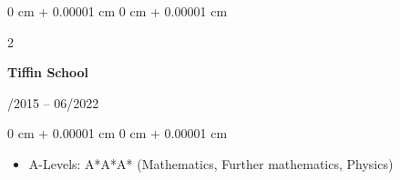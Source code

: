 \documentclass[10pt, letterpaper]{article}
\newenvironment{highlights}{
    \begin{itemize}[
        topsep=0.10 cm,
        parsep=0.10 cm,
        partopsep=0pt,
        itemsep=0pt,
        leftmargin=0 cm + 10pt
    ]
}{
    \end{itemize}
}
\newenvironment{onecolentry}{
    \begin{adjustwidth}{
        0 cm + 0.00001 cm
    }{
        0 cm + 0.00001 cm
    }
}{
    \end{adjustwidth}
}
\newenvironment{twocolentry}[2][]{
    \onecolentry
    \def\secondColumn{#2}
    \setcolumnwidth{\fill, 4.5 cm}
    \begin{paracol}{2}
}{
    \switchcolumn \raggedleft \secondColumn
    \end{paracol}
    \endonecolentry
} %
\begin{document}
        \vspace{0.2 cm}

        \begin{twocolentry}{
            09/2015 – 06/2022
        }
            \textbf{Tiffin School}
        \end{twocolentry}

        \vspace{0.10 cm}
        \begin{onecolentry}
            \begin{highlights}
                \item A-Levels: A*A*A* (Mathematics, Further mathematics, Physics)
            \end{highlights}
        \end{onecolentry}

        \vspace{0.2 cm}












\end{document}
